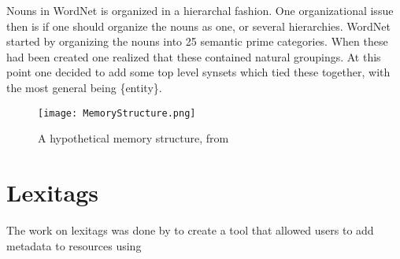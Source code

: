 Nouns in WordNet is organized in a hierarchal fashion. 
One organizational issue then is if one should organize the nouns as one, or several hierarchies.
WordNet started by organizing the nouns into 25 semantic prime categories.
When these had been created one realized that these contained natural groupings.
At this point one decided to add some top level synsets which tied these together, 
with the most general being \{entity\}\citep{Miller1990a}.

\begin{figure}[h]
    \begin{center}
        \texttt{[image: MemoryStructure.png]}
        \caption{A hypothetical memory structure, from \protect \citet{Collins1969}}
        \label{MemoryStructure}
    \end{center}
\end{figure}
\section{Lexitags}
\label{Lexitags}
The work on lexitags was done by \citet{Veres2011} to create a tool that allowed users to add metadata to resources
using 

